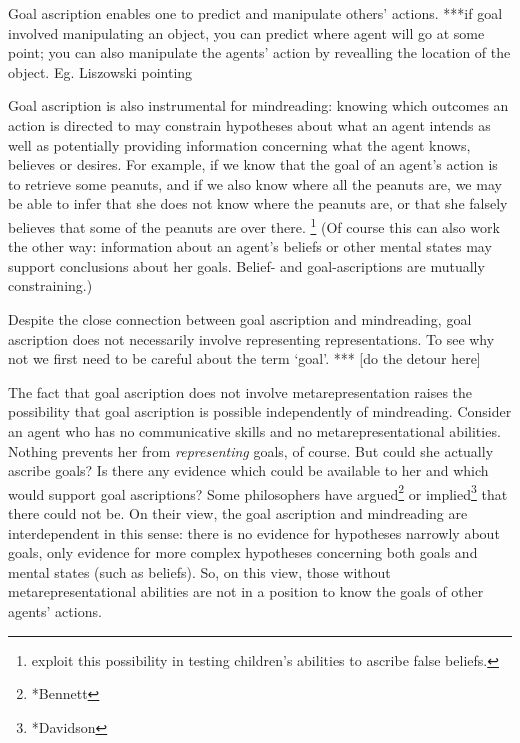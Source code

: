 \documentclass[14pt,a4paper]{extarticle}
\begin{document}
Goal ascription enables one
to predict and manipulate others' actions.
***if goal involved manipulating an object, you can predict where agent will go at some point; you can also manipulate the agents' action by revealling the location of the object.  Eg. Liszowski pointing


Goal ascription is also instrumental for mindreading:
knowing which outcomes an action is directed to may constrain hypotheses about what an agent intends 
as well as
potentially providing information concerning what the agent knows, believes or desires.
For example,
if we know that the goal of an agent's action is to retrieve some peanuts,
and if we also know where all the peanuts are,
we may be able to infer that she does not know where the peanuts are,
or that she falsely believes that some of the peanuts are over there.%
\footnote{
\citet{Wimmer:1998kx} exploit this possibility in testing children's abilities to ascribe false beliefs.
}
(Of course this can also work the other way:
information about an agent's beliefs or other mental states may support conclusions about her goals.
Belief- and goal-ascriptions are mutually constraining.)


Despite the close connection between goal ascription and mindreading,
goal ascription does not necessarily involve representing representations.
To see why not we first need to be careful about the term `goal'.
***
[do the detour here]

The fact that goal ascription does not involve metarepresentation raises the possibility that goal ascription is possible independently of mindreading.
Consider an agent who has no communicative skills and no metarepresentational abilities.
Nothing prevents her from \emph{representing} goals, of course.
But could she actually ascribe goals?
Is there any evidence which could be available to her and which would support goal ascriptions?
Some philosophers have argued\footnote{*Bennett} or implied\footnote{*Davidson} that there could not be.
On their view, the goal ascription and mindreading are interdependent in this sense: 
there is no evidence for hypotheses narrowly about goals, only evidence for more complex hypotheses concerning both goals and mental states (such as beliefs).
So, on this view, those without metarepresentational abilities are not in a position to know the goals of other agents' actions.
\end{document}
